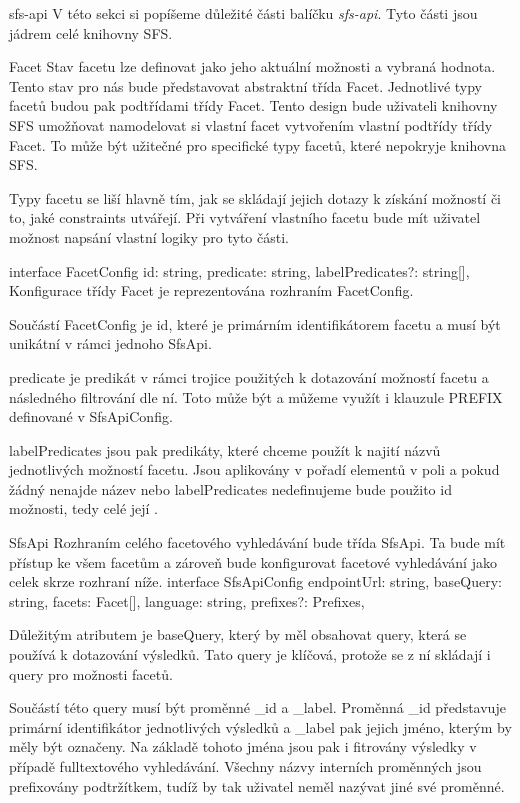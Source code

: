 \sec sfs-api
V této sekci si popíšeme důležité části balíčku {\em sfs-api}.
Tyto části jsou jádrem celé knihovny SFS.

\secc [facet] Facet
Stav facetu lze definovat jako jeho aktuální možnosti a vybraná hodnota.
Tento stav pro nás bude představovat abstraktní třída {\ssr Facet}.
Jednotlivé typy facetů budou pak podtřídami třídy {\ssr Facet}.
Tento design bude uživateli knihovny SFS umožňovat namodelovat si vlastní facet vytvořením vlastní podtřídy třídy {\ssr Facet}.
To může být užitečné pro specifické typy facetů, které nepokryje knihovna SFS.

Typy facetu se liší hlavně tím, jak se skládají jejich dotazy k získání možností či to, jaké constraints utvářejí.
Při vytváření vlastního facetu bude mít uživatel možnost napsání vlastní logiky pro tyto části.

\begtt
interface FacetConfig {
  id: string,
  predicate: string,
  labelPredicates?: string[],
}
\endtt
Konfigurace třídy {\ssr Facet} je reprezentována rozhraním {\ssr FacetConfig}.

Součástí {\ssr FacetConfig} je {\ssr id}, které je primárním identifikátorem facetu a musí být unikátní v rámci jednoho {\ssr SfsApi}.

{\ssr predicate} je predikát v rámci  trojice použitých k dotazování možností facetu a následného filtrování dle ní.
Toto může být  a můžeme využít i klauzule {\ssr PREFIX} definované v {\ssr SfsApiConfig}.

{\ssr labelPredicates} jsou pak predikáty, které chceme použít k najití názvů jednotlivých možností facetu.
Jsou aplikovány v pořadí elementů v poli a pokud žádný nenajde název nebo {\ssr labelPredicates} nedefinujeme bude použito {\ssr id} možnosti, tedy celé její .

\secc SfsApi
Rozhraním celého facetového vyhledávání bude třída {\ssr SfsApi}.
Ta bude mít přístup ke všem facetům a zároveň bude konfigurovat facetové vyhledávání jako celek skrze rozhraní níže.
\begtt
interface SfsApiConfig {
  endpointUrl: string,
  baseQuery: string,
  facets: Facet[],
  language: string,
  prefixes?: Prefixes,
}
\endtt

Důležitým atributem je {\ssr baseQuery}, který by měl obsahovat  query, která se používá k dotazování výsledků.
Tato query je klíčová, protože se z ní skládají i query pro možnosti facetů.

Součástí této query musí být proměnné {\ssr _id} a {\ssr _label}.
Proměnná {\ssr _id} představuje primární identifikátor jednotlivých výsledků a {\ssr _label} pak jejich jméno, kterým by měly být označeny.
Na základě tohoto jména jsou pak i fitrovány výsledky v případě fulltextového vyhledávání.
Všechny názvy interních  proměnných jsou prefixovány podtržítkem, tudíž by tak uživatel neměl nazývat jiné své proměnné.

